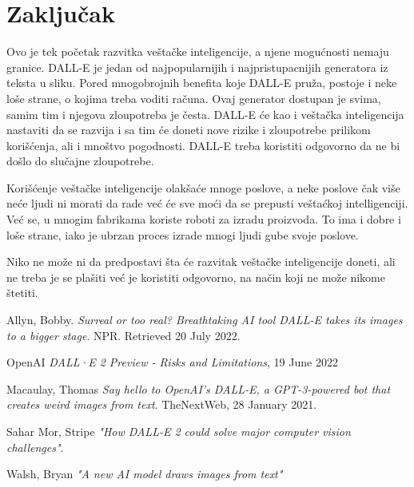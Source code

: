 \documentclass[a4paper]{article}
\begin{document}
\section{Zaključak}
\label{sec: Zaključak}
Ovo je tek početak razvitka veštačke inteligencije, a njene mogućnosti nemaju granice. DALL-E je jedan od najpopularnijih i najpristupacnijih generatora iz teksta u sliku. Pored mnogobrojnih benefita koje DALL-E pruža, postoje i neke loše strane, o kojima treba voditi računa. Ovaj generator dostupan je svima, samim tim i njegova zloupotreba je česta. DALL-E će kao i veštačka inteligencija nastaviti da se razvija i sa tim će doneti nove rizike i zloupotrebe prilikom korišćenja, ali i mnoštvo pogodnosti. DALL-E treba koristiti odgovorno da ne bi došlo do slučajne zloupotrebe.

Korišćenje veštačke inteligencije olakšaće mnoge poslove, a neke poslove čak više neće ljudi ni morati da rade već će sve moći da se prepusti veštaćkoj intelligenciji. Već se, u mnogim fabrikama koriste roboti za izradu proizvoda. To ima i dobre i loše strane, iako je ubrzan proces izrade mnogi ljudi gube svoje poslove.

Niko ne može ni da predpostavi šta će razvitak veštačke inteligencije doneti, ali ne treba je se plašiti već je koristiti odgovorno, na način koji ne može nikome štetiti. 
\appendix

\begin{thebibliography}{9}

 Allyn, Bobby. \emph{ Surreal or too real? Breathtaking AI tool DALL-E takes its images to a bigger stage}. NPR. Retrieved 20 July 2022.

  OpenAI \emph{  DALL·E 2 Preview - Risks and Limitations}, 19 June 2022 

  Macaulay, Thomas \emph{ Say hello to OpenAI's DALL-E, a GPT-3-powered bot that creates weird images from text}. TheNextWeb, 28 January 2021.

 Sahar Mor, Stripe \emph {"How DALL-E 2 could solve major computer vision challenges"}.

 Walsh, Bryan \emph{ "A new AI model draws images from text"}


\end{thebibliography}



\appendix
\end{document}
